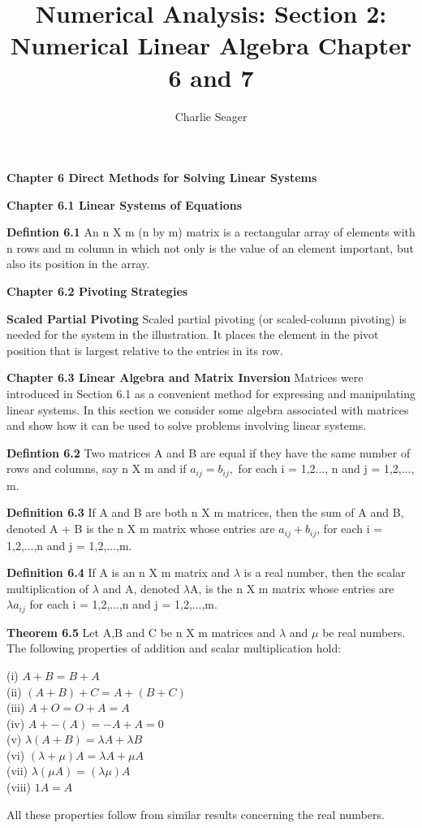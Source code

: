 \documentclass{article}
\begin{document}
\title{Numerical Analysis: Section 2: Numerical Linear Algebra Chapter 6 and 7}
\author{Charlie Seager}
\maketitle

\textbf {Chapter 6 Direct Methods for Solving Linear Systems}

\textbf {Chapter 6.1 Linear Systems of Equations}

\textbf {Defintion 6.1} An n X m (n by m) matrix is a rectangular array of elements with n rows and m column in which not only is the value of an element important, but also its position in the array. 

\textbf {Chapter 6.2 Pivoting Strategies}

\textbf {Scaled Partial Pivoting} Scaled partial pivoting (or scaled-column pivoting) is needed for the system in the illustration. It places the element in the pivot position that is largest relative to the entries in its row.

\textbf {Chapter 6.3 Linear Algebra and Matrix Inversion} Matrices were introduced in Section 6.1 as a convenient method for expressing and manipulating linear systems. In this section we consider some algebra associated with matrices and show how it can be used to solve problems involving linear systems.

\textbf{ Defintion 6.2} Two matrices A and B are equal if they have the same number of rows and columns, say n X m and if $a_{ij} = b_{ij},$ for each i = 1,2..., n and j = 1,2,..., m.

\textbf {Definition 6.3} If A and B are both n X m matrices, then the sum of A and B, denoted A + B is the n X m matrix whose entries are $a_{ij} + b_{ij}$, for each i = 1,2,...,n and j = 1,2,...,m.

\textbf {Definition 6.4} If A is an n X m matrix and $\lambda$ is a real number, then the scalar multiplication of $\lambda$ and A, denoted $\lambda$A, is the n X m matrix whose entries are $\lambda a_{ij}$ for each i = 1,2,...,n and j = 1,2,...,m.

\textbf {Theorem 6.5} Let A,B and C be n X m matrices and $\lambda$ and $\mu$ be real numbers. The following properties of addition and scalar multiplication hold:
\begin{center}
(i) $A + B = B + A$ \\
(ii) $(A + B) + C = A + (B + C) $ \\
(iii) $A + O = O + A = A$ \\
(iv) $A + -(A) = -A + A = 0$ \\
(v) $\lambda (A + B) = \lambda A + \lambda B$ \\
(vi) $(\lambda + \mu)A = \lambda A + \mu A$ \\
(vii) $ \lambda (\mu A) = (\lambda \mu) A$ \\
(viii) $1A = A$
\end{center}
All these properties follow from similar results concerning the real numbers.
\end{document}
